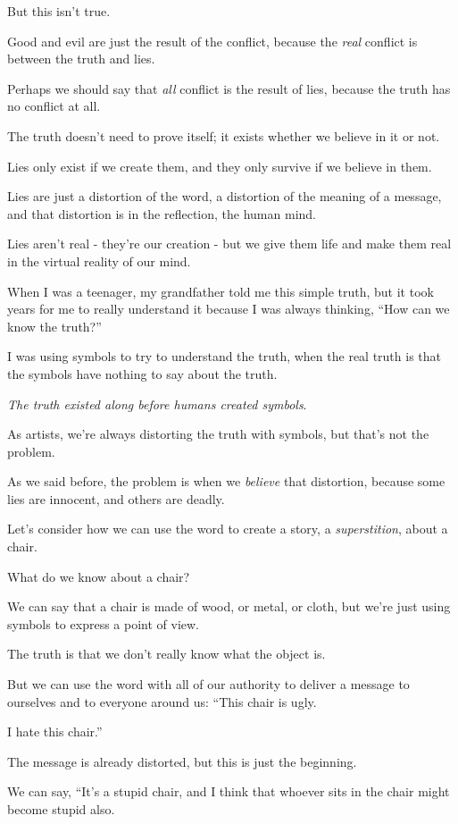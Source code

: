 \documentclass{article}
\numberwithin{equation}{section}
\begin{document}
But this isn't true.

Good and evil are just the result of the conflict, because the \textit{real} conflict is between the truth and lies.

Perhaps we should say that \textit{all} conflict is the result of lies, because the truth has no conflict at all.

The truth doesn't need to prove itself; it exists whether we believe in it or not.

Lies only exist if we create them, and they only survive if we believe in them.

Lies are just a distortion of the word, a distortion of the meaning of a message, and that distortion is in the reflection, the human mind.

Lies aren't real - they're our creation - but we give them life and make them real in the virtual reality of our mind.

%
When I was a teenager, my grandfather told me this simple truth, but it took years for me to really understand it because I was always thinking, ``How can we know the truth?''

I was using symbols to try to understand the truth, when the real truth is that the symbols have nothing to say about the truth.

\textit{The truth existed along before humans created symbols}.

%
As artists, we're always distorting the truth with symbols, but that's not the problem.

As we said before, the problem is when we \textit{believe} that distortion, because some lies are innocent, and others are deadly.

Let's consider how we can use the word to create a story, a \textit{superstition}, about a chair.

What do we know about a chair?

We can say that a chair is made of wood, or metal, or cloth, but we're just using symbols to express a point of view.

The truth is that we don't really know what the object is.

But we can use the word with all of our authority to deliver a message to ourselves and to everyone around us: ``This chair is ugly.

I hate this chair.''

%
The message is already distorted, but this is just the beginning.

We can say, ``It's a stupid chair, and I think that whoever sits in the chair might become stupid also.
\end{document}
